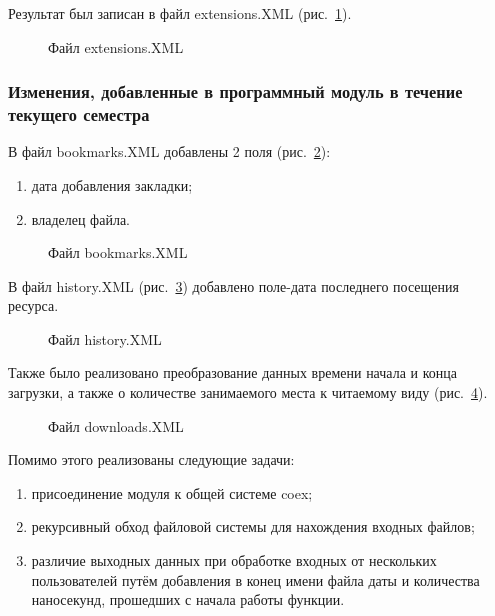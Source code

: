 Результат был записан в файл extensions.XML (рис.~\ref{ship_8:ship_8}).

\begin{figure}[h!]
\caption{Файл extensions.XML}
\label{ship_8:ship_8}
\end{figure}

\subsubsection{Изменения, добавленные в программный модуль в течение текущего семестра}

В файл bookmarks.XML добавлены 2 поля (рис.~\ref{ship_9:ship_9}):

\begin{enumerate}
  \item дата добавления закладки;
  \item владелец файла.
\end{enumerate}

\begin{figure}[h!]
\caption{Файл bookmarks.XML}
\label{ship_9:ship_9}
\end{figure}

В файл history.XML (рис.~\ref{ship_10:ship_10}) добавлено поле-дата последнего посещения ресурса.

\begin{figure}[h!]
\caption{Файл history.XML}
\label{ship_10:ship_10}
\end{figure}

Также было реализовано преобразование данных времени начала и конца загрузки, а также о количестве занимаемого места к читаемому виду (рис.~\ref{ship_11:ship_11}).

\begin{figure}[h!]
\caption{Файл downloads.XML}
\label{ship_11:ship_11}
\end{figure}

\clearpage
Помимо этого реализованы следующие задачи:

\begin{enumerate}
  \item присоединение модуля к общей системе coex;
  \item рекурсивный обход файловой системы для нахождения входных файлов;
  \item различие выходных данных при обработке входных от нескольких пользователей путём добавления в конец имени файла даты и количества наносекунд, прошедших с начала работы функции.
\end{enumerate}

